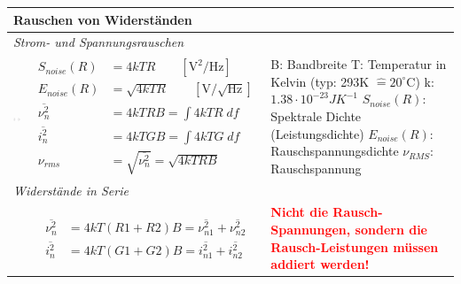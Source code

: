 \begin{longtable}[t]{|p{4cm}|p{6.5cm}|p{7cm}|}
    \hline
    \multicolumn{3}{|l|}{\bf Rauschen von Widerständen}
    \\ \hline
    \multicolumn{3}{|l|}{\textit{Strom- und Spannungsrauschen}}
    \\ \hdashline
    \includegraphics[width=4cm, valign=t]{pictures/widerstandrauschen.png}
    & {	\vspace{-1.8\topsep}
        \begin{align*}
            S_{noise}(R) &=4kTR \qquad [\mathrm{V^2/Hz}]\\
            E_{noise}(R) &=\sqrt{4kTR} \qquad [\mathrm{V/\sqrt{Hz}}]\\
            \overline{\nu^2_{n}} &=4kTRB = \int 4kTR \; df\\
            \overline{i^2_{n}} &=4kTGB = \int 4kTG \; df\\
            \nu_{rms} &= \sqrt{\overline{\nu^2_{n}}} = \sqrt{4kTRB}
        \end{align*}
      }
    & {B: Bandbreite\newline
       T:  Temperatur in Kelvin (typ: 293K $\hat{=}20^{\circ}$C)\newline
       k:  $1.38 \cdot 10^{-23}JK^{-1}$\newline
       $S_{noise}(R)$:  Spektrale Dichte (Leistungsdichte)\newline
       $E_{noise}(R)$: Rauschspannungsdichte\newline
       $\nu_{RMS}$:  Rauschspannung
      }
    \\ \hline
    \multicolumn{3}{|l|}{\textit{Widerstände in Serie}}
    \\ \hdashline
    
    & {	\vspace{-1.6\topsep}
        \begin{align*}
            \overline{\nu^2_{n}}&=4kT(R1+R2)B=\overline{\nu^2_{n1}}+\overline{\nu^2_{n2}}\\
            \overline{i^2_{n}}&=4kT(G1+G2)B=\overline{i^2_{n1}}+\overline{i^2_{n2}}
        \end{align*}
    }
    & {\textcolor{red}{\bf Nicht die Rausch-Spannungen, sondern die Rausch-Leistungen müssen addiert werden!}
    }
    \\ \hline
\end{longtable}
